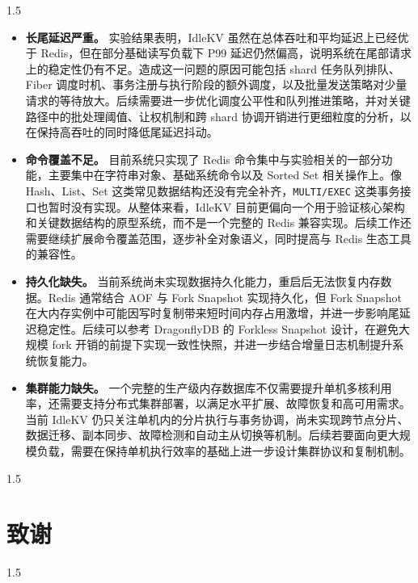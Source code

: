 \documentclass[a4paper,12pt,fontset=none,twoside]{article}
\numberwithin{figure}{section}
\numberwithin{equation}{section}
\numberwithin{table}{section}
\begin{document}
\begin{spacing}{1.5}
	\begin{itemize}
		\item \textbf{长尾延迟严重。} 实验结果表明，IdleKV 虽然在总体吞吐和平均延迟上已经优于 Redis，但在部分基础读写负载下 P99 延迟仍然偏高，说明系统在尾部请求上的稳定性仍有不足。造成这一问题的原因可能包括 shard 任务队列排队、Fiber 调度时机、事务注册与执行阶段的额外调度，以及批量发送策略对少量请求的等待放大。后续需要进一步优化调度公平性和队列推进策略，并对关键路径中的批处理阈值、让权机制和跨 shard 协调开销进行更细粒度的分析，以在保持高吞吐的同时降低尾延迟抖动。
		\item \textbf{命令覆盖不足。} 目前系统只实现了 Redis 命令集中与实验相关的一部分功能，主要集中在字符串对象、基础系统命令以及 Sorted Set 相关操作上。像 Hash、List、Set 这类常见数据结构还没有完全补齐，\texttt{MULTI/EXEC} 这类事务接口也暂时没有实现。从整体来看，IdleKV 目前更偏向一个用于验证核心架构和关键数据结构的原型系统，而不是一个完整的 Redis 兼容实现。后续工作还需要继续扩展命令覆盖范围，逐步补全对象语义，同时提高与 Redis 生态工具的兼容性。
		\item \textbf{持久化缺失。} 当前系统尚未实现数据持久化能力，重启后无法恢复内存数据。Redis 通常结合 AOF 与 Fork Snapshot 实现持久化，但 Fork Snapshot 在大内存实例中可能因写时复制带来短时间内存占用激增，并进一步影响尾延迟稳定性。后续可以参考 DragonflyDB 的 Forkless Snapshot 设计，在避免大规模 fork 开销的前提下实现一致性快照，并进一步结合增量日志机制提升系统恢复能力\cite{Dragonfly-RDB-Save}。
		\item \textbf{集群能力缺失。} 一个完整的生产级内存数据库不仅需要提升单机多核利用率，还需要支持分布式集群部署，以满足水平扩展、故障恢复和高可用需求。当前 IdleKV 仍只关注单机内的分片执行与事务协调，尚未实现跨节点分片、数据迁移、副本同步、故障检测和自动主从切换等机制。后续若要面向更大规模负载，需要在保持单机执行效率的基础上进一步设计集群协议和复制机制。
	\end{itemize}


	\newpage
	\begingroup
	\setlength{\bibsep}{0pt}
	\setlength{\parskip}{0pt}
	\setlength{\itemsep}{0pt}
	\setlength{\parsep}{0pt}
	\setlength{\topsep}{0pt}
	\setlength{\partopsep}{0pt}
	\begin{spacing}{1.5}
	
	
	\end{spacing}
	\endgroup


	\newpage

	\section*{致谢}
	\begin{spacing}{1.5}


\end{spacing}
\end{spacing}
\end{document}
